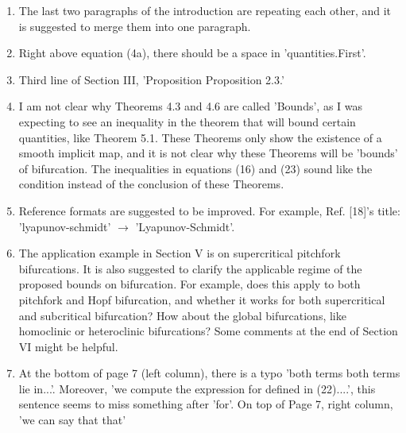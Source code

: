 \documentclass[letterpaper, 10 pt, conference]{ieeeconf}
\begin{document}
\begin{enumerate}
    \item The last two paragraphs of the introduction are repeating each other, and it is suggested to merge them into one paragraph. 
    \item Right above equation (4a), there should be a space in 'quantities.First'. 
    \item Third line of Section III, 'Proposition Proposition 2.3.' 
    \item I am not clear why Theorems 4.3 and 4.6 are called 'Bounds', as I was expecting to see an inequality in the theorem that will bound certain quantities, like Theorem 5.1. These Theorems only show the existence of a smooth implicit map, and it is not clear why these Theorems will be 'bounds' of bifurcation. The inequalities in equations (16) and (23) sound like the condition instead of the conclusion of these Theorems. 
    \item Reference formats are suggested to be improved. For example, Ref. [18]'s title: 'lyapunov-schmidt' \(\to\) 'Lyapunov-Schmidt'. 
    \item The application example in Section V is on supercritical pitchfork bifurcations. It is also suggested to clarify the applicable regime of the proposed bounds on bifurcation. For example, does this apply to both pitchfork and Hopf bifurcation, and whether it works for both supercritical and subcritical bifurcation? How about the global bifurcations, like homoclinic or heteroclinic bifurcations? Some comments at the end of Section VI might be helpful. 
    \item At the bottom of page 7 (left column), there is a typo 'both terms both terms lie in...'. Moreover, 'we compute the expression for defined in (22)....', this sentence seems to miss something after 'for'. On top of Page 7, right column, 'we can say that that' 
\end{enumerate}




\end{document}
